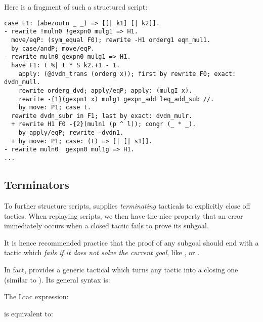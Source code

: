 Here is a fragment of such a structured script:

\begin{lstlisting}
case E1: (abezoutn _ _) => [[| k1] [| k2]].
- rewrite !muln0 !gexpn0 mulg1 => H1.
  move/eqP: (sym_equal F0); rewrite -H1 orderg1 eqn_mul1.
  by case/andP; move/eqP.
- rewrite muln0 gexpn0 mulg1 => H1.
  have F1: t %| t * S k2.+1 - 1.
    apply: (@dvdn_trans (orderg x)); first by rewrite F0; exact: dvdn_mull.
    rewrite orderg_dvd; apply/eqP; apply: (mulgI x).
    rewrite -{1}(gexpn1 x) mulg1 gexpn_add leq_add_sub //.
    by move: P1; case t.
  rewrite dvdn_subr in F1; last by exact: dvdn_mulr.
  + rewrite H1 F0 -{2}(muln1 (p ^ l)); congr (_ * _).
    by apply/eqP; rewrite -dvdn1.
  + by move: P1; case: (t) => [| [| s1]].
- rewrite muln0  gexpn0 mul1g => H1.
...
\end{lstlisting}

\subsection{Terminators}\label{ssec:termin}

To further structure scripts, \ssr{}
supplies \emph{terminating} tacticals to explicitly close off tactics.
When replaying scripts, we then have the nice property that
an error immediately occurs when a closed tactic fails to prove its
subgoal.

It is hence recommended practice that the proof of any subgoal should
end with a tactic which \emph{fails if it does not solve the current
  goal}, like ,  or .

In fact, \ssr{} provides a generic tactical which turns any tactic into
a closing one (similar to ). Its general syntax is:

\begin{center}
   {\tac}
\end{center}

The Ltac expression:

\begin{center}
  \ssrC{by [} \ssrC{| [} \ssrC{| ...].}
\end{center}

is equivalent to:

\begin{center}
  \ssrC{[by}    \ssrC{| ...].}
\end{center}

